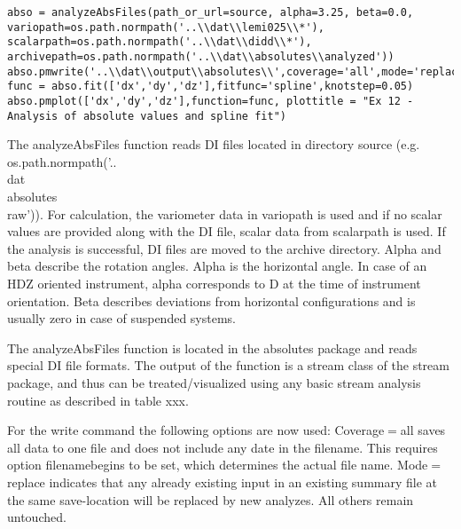 \begin{verbatim}
abso = analyzeAbsFiles(path_or_url=source, alpha=3.25, beta=0.0, variopath=os.path.normpath('..\\dat\\lemi025\\*'), scalarpath=os.path.normpath('..\\dat\\didd\\*'), archivepath=os.path.normpath('..\\dat\\absolutes\\analyzed'))
abso.pmwrite('..\\dat\\output\\absolutes\\',coverage='all',mode='replace',filenamebegins='absolutes_lemi')
func = abso.fit(['dx','dy','dz'],fitfunc='spline',knotstep=0.05)
abso.pmplot(['dx','dy','dz'],function=func, plottitle = "Ex 12 - Analysis of absolute values and spline fit")
\end{verbatim}
The analyzeAbsFiles function reads DI files located in directory source (e.g. os.path.normpath('..\\dat\\absolutes\\raw')). For calculation, the variometer data in variopath is used and if no scalar values are provided along with the DI file, scalar data from scalarpath is used. If the analysis is successful, DI files are moved to the archive directory. Alpha and beta describe the rotation angles. Alpha is the horizontal angle. In case of an HDZ oriented instrument, alpha corresponds to D at the time of instrument orientation. Beta describes deviations from horizontal configurations and is usually zero in case of suspended systems.

The analyzeAbsFiles function is located in the absolutes package and reads special DI file formats. The output of the function is a stream class of the stream package, and thus can be treated/visualized using any basic stream analysis routine as described in table xxx.

For the write command the following options are now used: Coverage$=$all saves all data to one file and does not include any date in the filename. This requires option filenamebegins to be set, which determines the actual file name. Mode$=$replace indicates that any already existing input in an existing summary file at the same save-location will be replaced by new analyzes. All others remain untouched.



